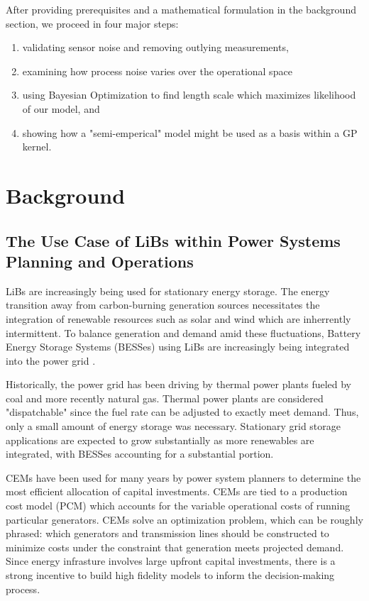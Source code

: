 \documentclass[conference]{IEEEtran}
\begin{document}
After providing prerequisites and a mathematical formulation in the background
section, we proceed in four major steps:
\begin{enumerate}
\item validating sensor noise and removing outlying measurements,
\item examining how process noise varies over the operational space
\item using Bayesian Optimization to find length scale which maximizes likelihood of our model, and
\item showing how a "semi-emperical" model might be used as a basis within a GP kernel.
\end{enumerate}






\section{Background}

\subsection{The Use Case of LiBs within Power Systems Planning and Operations}

LiBs are increasingly being used for stationary energy storage. 
The energy transition away from carbon-burning generation sources necessitates
the integration of renewable resources such as solar and wind which are inherrently
intermittent.  To balance generation and demand amid these fluctuations, Battery Energy Storage 
Systems (BESSes) using LiBs are increasingly being integrated into the power grid \cite{noauthor_battery_2015}.

Historically, the power grid has been driving by thermal power plants fueled by coal and more recently natural gas.
Thermal power plants are considered "dispatchable" since the fuel rate can be adjusted to exactly meet demand.
Thus, only a small amount of energy storage was necessary. Stationary grid storage applications
are expected to grow substantially as more renewables are integrated,
with BESSes accounting for a substantial portion. 

CEMs have been used for many years by power system planners to determine the most efficient allocation of capital investments. CEMs are tied to a production cost model (PCM) which accounts for the variable operational costs of running particular generators. CEMs solve an optimization problem, which can be roughly phrased: which generators and transmission
lines should be constructed to minimize costs under the constraint that generation meets projected demand.
Since energy infrasture involves large upfront capital investments, there is a strong incentive to build high fidelity models
to inform the decision-making process.
\end{document}
